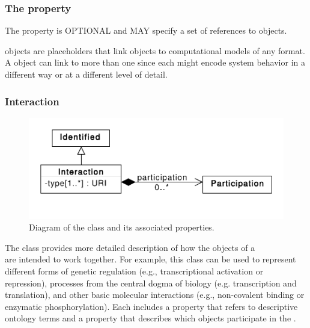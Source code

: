 \subsubsection*{The  property}\label{sec:models}
The  property is OPTIONAL and MAY specify a set of  references to  objects.

 objects are placeholders that link  objects to computational models of any format.
A  object can link to more than one  since each might encode system behavior in a different way or at a different level of detail.

\subsubsection{Interaction}
\label{sec:Interaction}

\begin{figure}[ht]
\begin{center}
\includegraphics[scale=0.6]{uml/interaction}
\caption[]{Diagram of the  class and its associated properties.}
\label{uml:interaction}
\end{center}
\end{figure}

The  class provides more detailed description of how the  objects of a\\  are intended to work together.
For example, this class can be used to represent different forms of genetic regulation (e.g., transcriptional activation or repression), processes from the central dogma of biology (e.g. transcription and translation), and other basic molecular interactions (e.g., non-covalent binding or enzymatic phosphorylation).
Each  includes a  property that refers to descriptive ontology terms and a  property that describes which  objects participate in the .

